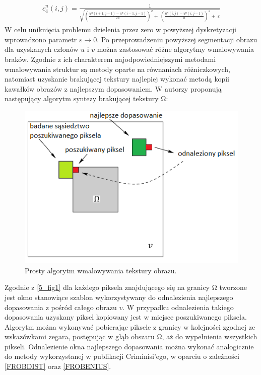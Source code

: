 \documentclass[12pt, twoside, openany]{report}
\theoremstyle{definition}
\begin{document}
\begin{align}
\begin{aligned}
c^n_4\left(i,j\right)=\frac{1}{\sqrt{{\left(\frac{u^n\left(i+1,j-1\right)-u^n\left(i-1,j-1\right)}{2h}\right)}^2+\ {\left(\frac{u^n\left(i,j\right)-u^n\left(i,j-1\right)}{h}\right)}^2+\ \varepsilon }}
\end{aligned}
\end{align}
W celu uniknięcia problemu dzielenia przez zero w powyższej dyskretyzacji wprowadzono parametr $\varepsilon \longrightarrow 0$. 
Po przeprowadzeniu powyższej segmentacji obrazu dla uzyskanych członów $u$ i $v$ można zastosować różne algorytmy wmalowywania braków. Zgodnie z ich charakterem najodpowiedniejszymi metodami wmalowywania struktur są metody oparte na równaniach różniczkowych, natomiast uzyskanie brakującej tekstury najlepiej wykonać metodą kopii kawałków obrazów z najlepszym dopasowaniem. W \cite{NavierStokesAndTexturePropagation} autorzy proponują następujący algorytm syntezy brakującej tekstury $\mathrm{\Omega }$:
\begin{figure}[!h]
	\centering
	\includegraphics[scale=1]{rysunki/5_fig1}
	\caption{Prosty algorytm wmalowywania tekstury obrazu.}
	\label{5_fig1}
\end{figure}
Zgodnie z \autoref{5_fig1} dla każdego piksela znajdującego się na granicy $\mathrm{\Omega }$ tworzone jest okno stanowiące szablon wykorzystywany do odnalezienia najlepszego dopasowania z pośród całego obrazu $v$. W przypadku odnalezienia takiego dopasowania uzyskany piksel kopiowany jest w miejsce poszukiwanego piksela. Algorytm można wykonywać pobierając piksele z granicy w kolejności zgodnej ze wskazówkami zegara, postępując w głąb obszaru $\mathrm{\Omega }$, aż do wypełnienia wszystkich pikseli. Odnalezienie okna najlepszego dopasowania można wykonać analogicznie do metody wykorzystanej w publikacji Criminisi'ego, w oparciu o zależności \eqref{FROBDIST} oraz \eqref{FROBENIUS}. 
\end{document}
